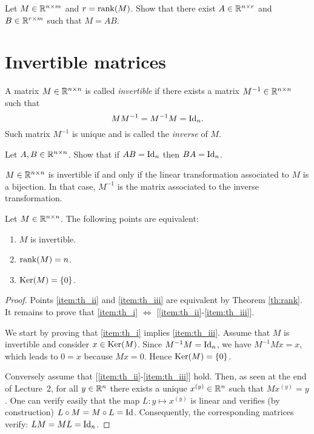 \documentclass[11pt,nocut]{article}
\begin{document}
\begin{exercise}[Important]
	Let $M \in \mathbb{R}^{n \times m}$ and $r = {{\rm rank}}(M)$. Show that there exist $A \in \mathbb{R}^{n \times r}$ and $B \in \mathbb{R}^{r \times m}$ such that $M = AB$.
\end{exercise}

\section{Invertible matrices}

\begin{definition}\label{prop:matrix_inverse}
	A matrix $M \in \mathbb{R}^{n \times n}$ is called \emph{invertible} if there exists a matrix $M^{-1} \in \mathbb{R}^{n \times n}$ such that 
	$$
	M M^{-1} = M^{-1} M = {{\rm Id}}_n.
	$$
	Such matrix $M^{-1}$ is unique and is called the \emph{inverse} of $M$.
\end{definition}

\begin{exercise} 
	Let $A,B \in \mathbb{R}^{n \times n}$. Show that if $AB = {{\rm Id}}_n$ then $BA = {{\rm Id}}_n$.
\end{exercise}

\begin{remark}
	$M \in \mathbb{R}^{n \times n}$ is invertible if and only if the linear transformation associated to $M$ is a bijection. In that case, $M^{-1}$ is the matrix associated to the inverse transformation.
\end{remark}

\begin{theorem}
	Let $M \in \mathbb{R}^{n \times n}$. The following points are equivalent:
	\begin{enumerate}[label=(\roman*)]
		\item \label{item:th_i} $M$ is invertible.
		\item \label{item:th_ii} ${{\rm rank}}(M) = n$.
		\item \label{item:th_iii} ${{\rm Ker}}(M) = \{0\}$.
	\end{enumerate}
\end{theorem}
\begin{proof}
	Points \ref{item:th_ii} and \ref{item:th_iii} are equivalent by Theorem \ref{th:rank}. 
	It remains to prove that \ref{item:th_i} $\Leftrightarrow$ [\ref{item:th_ii}-\ref{item:th_iii}].

	We start by proving that \ref{item:th_i} implies \ref{item:th_iii}. Assume that $M$ is invertible and consider $x \in {{\rm Ker}}(M)$. Since $M^{-1} M = {{\rm Id}}_n$, we have $M^{-1} M x = x$, which leads to $0 = x$ because $Mx = 0$. Hence ${{\rm Ker}}(M) = \{0\}$.

	Conversely assume that [\ref{item:th_ii}-\ref{item:th_iii}] hold. Then, as seen at the end of Lecture~2, for all $y \in \mathbb{R}^n$ there exists a unique $x^{(y)}\in \mathbb{R}^n$ such that $Mx^{(y)} = y$. One can verify easily that the map $L: y \mapsto x^{(y)}$ is linear and verifies (by construction) $L \circ M = M \circ L = {{\rm Id}}$. Consequently, the corresponding matrices verify: $LM=ML={{\rm Id}}_n$.
\end{proof}
\end{document}
